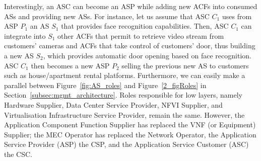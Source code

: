 Interestingly, an ASC can become an ASP while adding new ACFs into consumed ASs and providing new ASs. For instance, let us assume that ASC $C_1$ uses from ASP $P_1$ an AS $S_1$ that provides face recognition capabilities. Then, ASC $C_1$ can integrate into $S_1$ other ACFs that permit to retrieve video stream from customers' cameras and ACFs that take control of customers' door, thus building a new AS $S_2$, which provides automatic door opening based on face recognition. ASC $C_1$ then becomes a new ASP $P_2$ selling the previous new AS to customers such as house/apartment rental platforms. Furthermore, we can easily make a parallel between Figure~\ref{fig:AS_roles} and Figure~\ref{2_figRoles} in Section~\ref{subsec:mgmt_architecture}. Roles responsible for low layers, namely Hardware Supplier, Data Center Service Provider, NFVI Supplier, and Virtualisation Infrastructure Service Provider, remain the same. However, the Application Component Function Supplier has replaced the VNF (or Equipment) Supplier; the MEC Operator has replaced the Network Operator, the Application Service Provider (ASP) the CSP, and the Application Service Customer (ASC) the CSC. 

